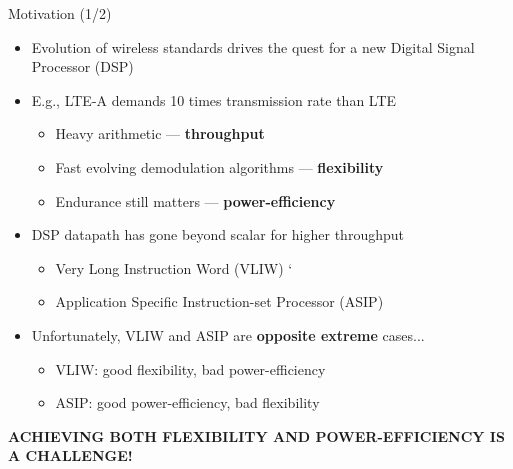 \documentclass{beamer}
\begin{document}
\begin{CJK}{UTF8}{bkai}
    \begin{frame}{Motivation (1/2)}
        \begin{itemize}
            \pause
            \item {
                    Evolution of wireless standards drives the quest for a new Digital Signal Processor (DSP)
                }
            \pause
            \item {
                    E.g., LTE-A demands 10 times transmission rate than LTE
                    \begin{itemize}
                        \pause
                        \item {
                                Heavy arithmetic --- \textbf{throughput}
                            }
                        \pause
                        \item {
                                Fast evolving demodulation algorithms --- \textbf{flexibility}
                            }
                        \pause
                        \item {
                                Endurance still matters --- \textbf{power-efficiency}
                            }
                    \end{itemize}
                }
            \pause
            \item { 
                    DSP datapath has gone beyond scalar for higher throughput
                    \begin{itemize}
                        \pause
                        \item Very Long Instruction Word (VLIW)
                    `   \pause
                        \item Application Specific Instruction-set Processor (ASIP)
                    \end{itemize}
                }
            \pause
            \item {
                    Unfortunately, VLIW and ASIP are \textbf{opposite extreme} cases...
                    \begin{itemize}
                        \item VLIW: good flexibility, bad power-efficiency
                        \item ASIP: good power-efficiency, bad flexibility
                    \end{itemize}
                }
        \end{itemize}
        \pause
        \begin{center}
        \large{\textbf{ACHIEVING BOTH FLEXIBILITY AND POWER-EFFICIENCY IS A CHALLENGE!}}
        \end{center}
    \end{frame}


\end{CJK}
\end{document}
